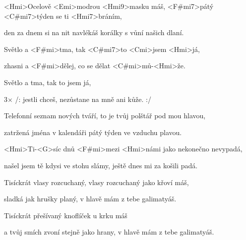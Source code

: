 

\zs
<Hmi>Ocelově <Emi>modrou <Hmi9>masku máš,
<F#mi7>pátý <C#mi7>týden se ti <Hmi7>bráním,

den za dnem si na nit navlékáš korálky s vůní našich dlaní.
\ks

\zr
Světlo a <F#mi>tma, tak <C#mi7>to <Cmi>jsem <Hmi>já,

zhasni a <F#mi>dělej, co se dělat <C#mi>mů-<Hmi>že.

Světlo a tma, tak to jsem já,

3× /: jestli chceš, nezůstane na mně ani kůže. :/
\kr

\zs
Telefonní seznam nových tváří,
to je tvůj polštář pod mou hlavou,

zatržená jména v kalendáři
pátý týden ve vzduchu plavou.
\ks

\zr \kr

\zs
<Hmi>Ti-<G>síc dnů <F#mi>mezi <Hmi>námi
jako nekonečno nevypadá,

našel jsem tě kdysi ve stohu slámy,
ještě dnes mi za košili padá.
\ks

\zs
Tisíckrát vlasy rozcuchaný,
vlasy rozcuchaný jako křoví máš,

sladká jak hrušky planý,
v hlavě mám z tebe galimatyáš.
\ks

\zs
Tisíckrát přešívaný
knoflíček u krku máš

a tvůj smích zvoní stejně jako hrany,
v hlavě mám z tebe galimatyáš.
\ks

\kp
